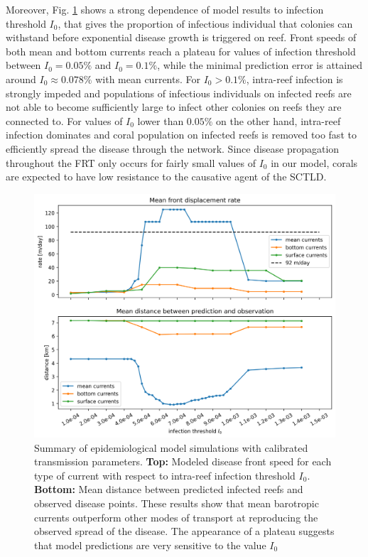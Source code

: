 \documentclass[utf8]{frontiersSCNS}
\begin{document}
Moreover, Fig. \ref{fig:results} shows a strong dependence of model results to infection threshold $I_0$, that gives the proportion of infectious individual that colonies can withstand before exponential disease growth is triggered on reef. Front speeds of both mean and bottom currents reach a plateau for values of infection threshold between $I_0=0.05\%$ and $I_0=0.1\%$, while the minimal prediction error is attained around $I_0 \approx 0.078\%$ with mean currents. For $I_0 > 0.1\%$, intra-reef infection is strongly impeded and populations of infectious individuals on infected reefs are not able to become sufficiently large to infect other colonies on reefs they are connected to. For values of $I_0$ lower than $0.05\%$ on the other hand, intra-reef infection dominates and coral population on infected reefs is removed too fast to efficiently spread the disease through the network. Since disease propagation throughout the FRT only occurs for fairly small values of $I_0$ in our model, corals are expected to have low resistance to the causative agent of the SCTLD. 

\begin{figure}
    \centering
    \includegraphics[width=.8\textwidth]{figures/sctld_validation_corrected.png}
    \caption{Summary of epidemiological model simulations with calibrated transmission parameters. \textbf{Top:} Modeled disease front speed for each type of current with respect to intra-reef infection threshold $I_0$. \textbf{Bottom:} Mean distance between predicted infected reefs and observed disease points. These results show that mean barotropic currents outperform other modes of transport at reproducing the observed spread of the disease. The appearance of a plateau suggests that model predictions are very sensitive to the value $I_0$}
    \label{fig:results}
\end{figure}
\end{document}
